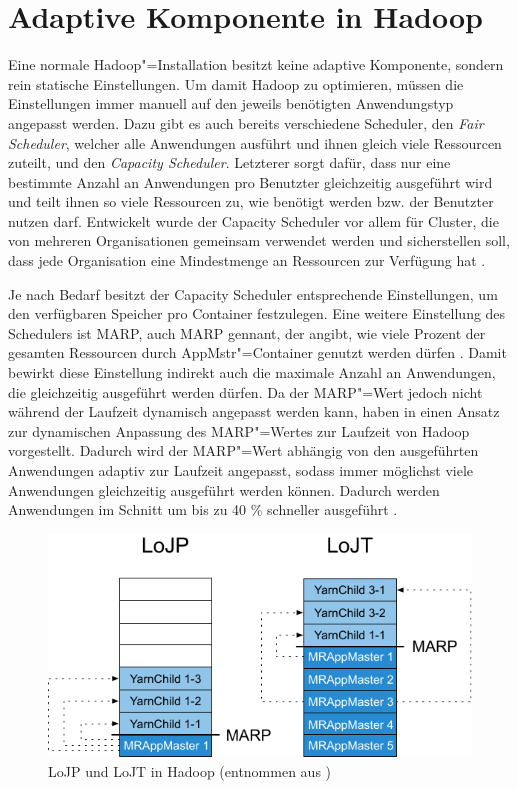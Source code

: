 \section{Adaptive Komponente in Hadoop}\label{sec:inriaSetting}

Eine normale Hadoop"=Installation besitzt keine adaptive Komponente, sondern rein statische Einstellungen.
Um damit Hadoop zu optimieren, müssen die Einstellungen immer manuell auf den jeweils benötigten Anwendungstyp angepasst werden.
Dazu gibt es auch bereits verschiedene Scheduler, den \emph{Fair Scheduler}, welcher alle Anwendungen ausführt und ihnen gleich viele Ressourcen zuteilt, und den \emph{Capacity Scheduler}.
Letzterer sorgt dafür, dass nur eine bestimmte Anzahl an Anwendungen pro Benutzter gleichzeitig ausgeführt wird und teilt ihnen so viele Ressourcen zu, wie benötigt werden bzw. der Benutzter nutzen darf.
Entwickelt wurde der Capacity Scheduler vor allem für Cluster, die von mehreren Organisationen gemeinsam verwendet werden und sicherstellen soll, dass jede Organisation eine Mindestmenge an Ressourcen zur Verfügung hat \cite{HadoopCapScheduler271}.

Je nach Bedarf besitzt der Capacity Scheduler entsprechende Einstellungen, um \zB den verfügbaren Speicher pro Container festzulegen.
Eine weitere Einstellung des Schedulers ist \acl{MARP}, auch \acs{MARP} gennant, der angibt, wie viele Prozent der gesamten Ressourcen durch \ac{AppMstr}"=Container genutzt werden dürfen \cite{HadoopCapScheduler271}.
Damit bewirkt diese Einstellung indirekt auch die maximale Anzahl an Anwendungen, die gleichzeitig ausgeführt werden dürfen.
Da der \ac{MARP}"=Wert jedoch nicht während der Laufzeit dynamisch angepasst werden kann, haben \citeauthor{zhang2016} in \cite{zhang2016} einen Ansatz zur dynamischen Anpassung des \ac{MARP}"=Wertes zur Laufzeit von Hadoop vorgestellt.
Dadurch wird der \ac{MARP}"=Wert abhängig von den ausgeführten Anwendungen adaptiv zur Laufzeit angepasst, sodass immer möglichst viele Anwendungen gleichzeitig ausgeführt werden können.
Dadurch werden Anwendungen im Schnitt um bis zu 40 \% schneller ausgeführt \cite{zhang2016}.

\begin{figure}
    \includegraphics{./images/marpValue.pdf}
    \caption[LoJP und LoJT in Hadoop]{LoJP und LoJT in Hadoop (entnommen aus \cite{zhang2016})}
    \label{fig:marpValue}
\end{figure}

